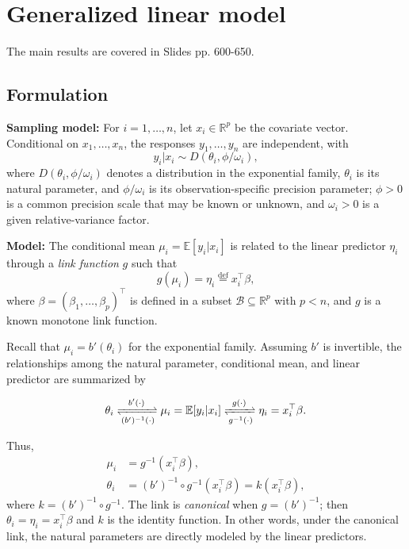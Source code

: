 \documentclass{article}
\newenvironment{mybox}{%
  \par\addvspace{10pt}%
  \begin{mdframed}[skipabove=0pt,skipbelow=10pt]%
}{%
  \end{mdframed}%
}
\theoremstyle{break}
\newcommand{\R}{\ensuremath{\mathbb{R}}}
\newcommand{\E}{\ensuremath{\mathbb{E}}}
\begin{document}
\section{Generalized linear model}\label{sec:glm}
The main results are covered in Slides pp. 600-650.

\subsection{Formulation}\label{sec:glm-formulation}
\textbf{Sampling model:} For $i=1,\ldots,n$, let $x_i\in\R^p$ be the covariate vector. Conditional on $x_1,\ldots,x_n$, the responses $y_1,\ldots,y_n$ are independent, with
\[
y_i | x_i\sim D(\theta_i,\phi/\omega_i),
\]
where $D(\theta_i,\phi/\omega_i)$ denotes a distribution in the exponential family, $\theta_i$ is its natural parameter, and $\phi/\omega_i$ is its observation-specific precision parameter; $\phi>0$ is a common precision scale that may be known or unknown, and $\omega_i>0$ is a given relative-variance factor.

\textbf{Model:} The conditional mean $\mu_i=\E[y_i | x_i]$ is related to the linear predictor $\eta_i$ through a \emph{link function} $g$ such that
\[
g(\mu_i) = \eta_i \stackrel{\mathrm{def}}{=}x_i^\top\beta,
\]
where $\beta=(\beta_1,\ldots,\beta_p)^\top$ is defined in a subset $\mathcal{B}\subseteq\R^p$ with $p < n$, and $g$ is a known monotone link function.

Recall that $\mu_i=b'(\theta_i)$ for the exponential family. Assuming $b'$ is invertible, the relationships among the natural parameter, conditional mean, and linear predictor are summarized by
\begin{mybox}
\begin{equation}\label{eq:GLM-relationship}
    \theta_i
    \xrightleftharpoons[(b')^{-1}(\cdot)]{b'(\cdot)}
    \mu_i=\E[y_i | x_i]
    \xrightleftharpoons[g^{-1}(\cdot)]{g(\cdot)}
    \eta_i=x_i^\top\beta.
\end{equation}
\end{mybox}
Thus,
\begin{align*}
  \mu_i &= g^{-1}(x_i^\top\beta), \\
  \theta_i &= (b')^{-1}\circ g^{-1}(x_i^\top\beta)
  =k(x_i^\top\beta),
\end{align*}
where $k=(b')^{-1}\circ g^{-1}$. The link is \emph{canonical} when $g=(b')^{-1}$; then $\theta_i=\eta_i=x_i^\top\beta$ and $k$ is the identity function. In other words, under the canonical link, the natural parameters are directly modeled by the linear predictors.
\end{document}
